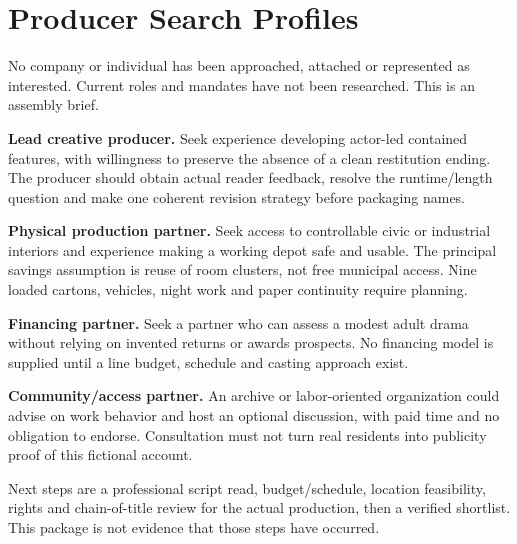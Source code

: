 \section{Producer Search Profiles}
No company or individual has been approached, attached or represented as interested. Current roles and mandates have not been researched. This is an assembly brief.

\textbf{Lead creative producer.} Seek experience developing actor-led contained features, with willingness to preserve the absence of a clean restitution ending. The producer should obtain actual reader feedback, resolve the runtime/length question and make one coherent revision strategy before packaging names.

\textbf{Physical production partner.} Seek access to controllable civic or industrial interiors and experience making a working depot safe and usable. The principal savings assumption is reuse of room clusters, not free municipal access. Nine loaded cartons, vehicles, night work and paper continuity require planning.

\textbf{Financing partner.} Seek a partner who can assess a modest adult drama without relying on invented returns or awards prospects. No financing model is supplied until a line budget, schedule and casting approach exist.

\textbf{Community/access partner.} An archive or labor-oriented organization could advise on work behavior and host an optional discussion, with paid time and no obligation to endorse. Consultation must not turn real residents into publicity proof of this fictional account.

Next steps are a professional script read, budget/schedule, location feasibility, rights and chain-of-title review for the actual production, then a verified shortlist. This package is not evidence that those steps have occurred.
